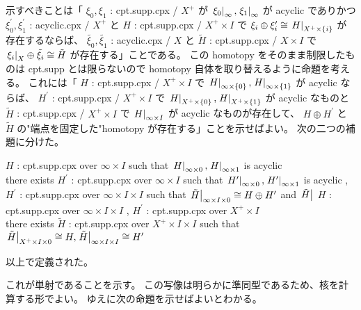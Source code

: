 \documentclass[dvipdfmx]{jsarticle}
\begin{document}
\begin{Proof}[\(\xi\) のとり方によらないこと]
\itemprof
  示すべきことは「 \(\xi_0 , \xi_1\) : cpt.supp.cpx / \(X^+\) が \(\left. {\xi_0} \right| _{\infty} , \left. {\xi_1} \right| _{\infty}\) が acyclic でありかつ \(\xi_0^\prime , \xi_1^\prime\) : acyclic.cpx / \(X^+\) と \(H\) : cpt.supp.cpx / \(X^+ \times I\) で \(\xi_i \oplus \xi_i^\prime \cong \left. {H} \right| _{X^+ \times \{i\}}\) が存在するならば、 \(\tilde{\xi_0} , \tilde{\xi_1}\) : acyclic.cpx / \(X\) と \(\tilde{H}\) : cpt.supp.cpx / \(X \times I\) で \(\left. {\xi_i} \right| _{X} \oplus \tilde{\xi_i} \cong \tilde{H}\) が存在する」ことである。
  この homotopy をそのまま制限したものは cpt.supp とは限らないので homotopy 自体を取り替えるように命題を考える。
  これには「 \(H\) : cpt.supp.cpx / \(X^+ \times I\) で \(\left. {H} \right| _{\infty \times \{0\}} , \left. {H} \right| _{\infty \times \{1\}}\) が acyclic ならば、 \(H^\prime\) : cpt.supp.cpx / \(X^+ \times I\) で \(\left. {H} \right| _{X^+ \times \{0\}} , \left. {H} \right| _{X^+ \times \{1\}}\) が acyclic なものと \(\tilde{H}\) : cpt.supp.cpx / \(X^+ \times I\) で \(\left. {H} \right| _{\infty \times I}\) が acyclic なものが存在して、 \(H \oplus H^\prime\) と \(\tilde{H}\) の"端点を固定した"homotopy が存在する」ことを示せばよい。
  次の二つの補題に分けた。
\end{Proof}

\begin{Theorem}
  \itemprop
  \For \(H\) : cpt.supp.cpx over \(\infty \times I\) such that \(\left. {H} \right| _{\infty \times 0} , \left. {H} \right| _{\infty \times 1}\) is acyclic \\
  \Then there exists \(H^\prime\) : cpt.supp.cpx over \(\infty \times I\) such that \(\left. {H^\prime} \right| _{\infty \times 0} , \left. {H^\prime} \right| _{\infty \times 1}\) is acyclic , \(H ^\prime\) : cpt.supp.cpx over \(\infty \times I \times I\) such that \(\left. {\tilde{H}} \right| _{\infty \times I \times 0} \cong H \oplus H^\prime\) and \(\left. {\tilde{H}} \right| _{}\)
\itemprop
  \For \(H\) : cpt.supp.cpx over \(\infty \times I \times I\) , \(H^\prime\) : cpt.supp.cpx over \(X^+ \times I\) \\
  \Then there exists \(\tilde{H}\) : cpt.supp.cpx over \(X^+ \times I \times I\) such that \(\left. {\tilde{H}} \right| _{X^+ \times I \times 0} \cong H , \left. {\tilde{H}} \right| _{\infty \times I \times I} \cong H^\prime\)
\end{Theorem}

以上で定義された。

これが単射であることを示す。
この写像は明らかに準同型であるため、核を計算する形でよい。
ゆえに次の命題を示せばよいとわかる。
\end{document}
